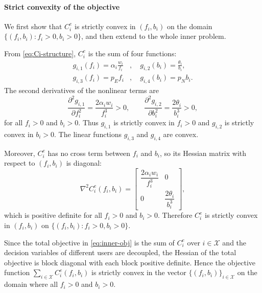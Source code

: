 \documentclass[lettersize,journal]{IEEEtran}
\begin{document}
\paragraph{Strict convexity of the objective}
We first show that $C_i^e$ is strictly convex in $(f_i,b_i)$ on the domain $\{(f_i,b_i): f_i>0, b_i>0\}$, and then extend to the whole inner problem.

From \eqref{eq:Ci-structure}, $C_i^e$ is the sum of four functions:
\begin{align*}
    g_{i,1}(f_i) = \alpha_i\frac{w_i}{f_i}&,\quad
  g_{i,2}(b_i) = \frac{\theta_i}{b_i},\\
  g_{i,3}(f_i) = p_E f_i&,\quad
  g_{i,4}(b_i) = p_N b_i.
\end{align*}
The second derivatives of the nonlinear terms are
\begin{equation}
  \frac{\partial^2 g_{i,1}}{\partial f_i^2}
  = \frac{2\alpha_i w_i}{f_i^3} > 0, \qquad
  \frac{\partial^2 g_{i,2}}{\partial b_i^2}
  = \frac{2\theta_i}{b_i^3} > 0,
\end{equation}
for all $f_i>0$ and $b_i>0$.
Thus $g_{i,1}$ is strictly convex in $f_i>0$ and $g_{i,2}$ is strictly convex in $b_i>0$.
The linear functions $g_{i,3}$ and $g_{i,4}$ are convex.

Moreover, $C_i^e$ has no cross term between $f_i$ and $b_i$, so its Hessian matrix with respect to $(f_i,b_i)$ is diagonal:
\begin{equation}
  \nabla^2 C_i^e(f_i,b_i)
  =
  \begin{bmatrix}
    \dfrac{2\alpha_i w_i}{f_i^3} & 0\\[0.5em]
    0 & \dfrac{2\theta_i}{b_i^3}
  \end{bmatrix},
\end{equation}
which is positive definite for all $f_i>0$ and $b_i>0$.
Therefore $C_i^e$ is strictly convex in $(f_i,b_i)$ on $\{(f_i,b_i): f_i>0, b_i>0\}$.

Since the total objective in \eqref{eq:inner-obj} is the sum of $C_i^e$ over $i\in\mathcal{X}$ and the decision variables of different users are decoupled, the Hessian of the total objective is block diagonal with each block positive definite.
Hence the objective function $\sum_{i\in\mathcal{X}} C_i^e(f_i,b_i)$
is strictly convex in the vector $\{(f_i,b_i)\}_{i\in\mathcal{X}}$ on the domain where all $f_i>0$ and $b_i>0$.
\end{document}
